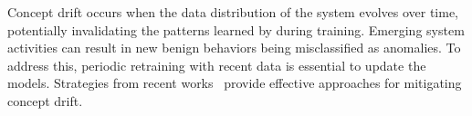  Concept drift occurs when the data distribution of the system evolves over time, potentially invalidating the patterns learned by \Sys during training. Emerging system activities can result in new benign behaviors being misclassified as anomalies. To address this, periodic retraining with recent data is essential to update the models. Strategies from recent works~\cite{lu2018learning, barbero2022transcending,jordaney2017transcend} provide effective approaches for mitigating concept drift.








